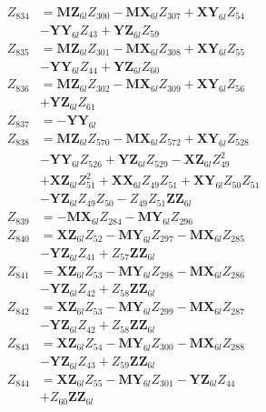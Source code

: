 \begin{multicols}{2}
\begin{align}
Z_{834} &= \mathbf{MZ}_{6l}Z_{300} - \mathbf{MX}_{6l}Z_{307} + \mathbf{XY}_{6l}Z_{54}  \nonumber \\
&- \mathbf{YY}_{6l}Z_{43} + \mathbf{YZ}_{6l}Z_{59} \nonumber \\
Z_{835} &= \mathbf{MZ}_{6l}Z_{301} - \mathbf{MX}_{6l}Z_{308} + \mathbf{XY}_{6l}Z_{55}  \nonumber \\
&- \mathbf{YY}_{6l}Z_{44} + \mathbf{YZ}_{6l}Z_{60} \nonumber \\
Z_{836} &= \mathbf{MZ}_{6l}Z_{302} - \mathbf{MX}_{6l}Z_{309} + \mathbf{XY}_{6l}Z_{56}  \nonumber \\
&+ \mathbf{YZ}_{6l}Z_{61} \nonumber \\
Z_{837} &= -\mathbf{YY}_{6l} \nonumber \\
Z_{838} &= \mathbf{MZ}_{6l}Z_{570} - \mathbf{MX}_{6l}Z_{572} + \mathbf{XY}_{6l}Z_{528}  \nonumber \\
&- \mathbf{YY}_{6l}Z_{526} + \mathbf{YZ}_{6l}Z_{529} - \mathbf{XZ}_{6l}Z_{49}^2  \nonumber \\
&+ \mathbf{XZ}_{6l}Z_{51}^2 + \mathbf{XX}_{6l}Z_{49}Z_{51} + \mathbf{XY}_{6l}Z_{50}Z_{51}  \nonumber \\
&- \mathbf{YZ}_{6l}Z_{49}Z_{50} - Z_{49}Z_{51}\mathbf{ZZ}_{6l} \nonumber \\
Z_{839} &= - \mathbf{MX}_{6l}Z_{284} - \mathbf{MY}_{6l}Z_{296} \nonumber \\
Z_{840} &= \mathbf{XZ}_{6l}Z_{52} - \mathbf{MY}_{6l}Z_{297} - \mathbf{MX}_{6l}Z_{285}  \nonumber \\
&- \mathbf{YZ}_{6l}Z_{41} + Z_{57}\mathbf{ZZ}_{6l} \nonumber \\
Z_{841} &= \mathbf{XZ}_{6l}Z_{53} - \mathbf{MY}_{6l}Z_{298} - \mathbf{MX}_{6l}Z_{286}  \nonumber \\
&- \mathbf{YZ}_{6l}Z_{42} + Z_{58}\mathbf{ZZ}_{6l} \nonumber \\
Z_{842} &= \mathbf{XZ}_{6l}Z_{53} - \mathbf{MY}_{6l}Z_{299} - \mathbf{MX}_{6l}Z_{287}  \nonumber \\
&- \mathbf{YZ}_{6l}Z_{42} + Z_{58}\mathbf{ZZ}_{6l} \nonumber \\
Z_{843} &= \mathbf{XZ}_{6l}Z_{54} - \mathbf{MY}_{6l}Z_{300} - \mathbf{MX}_{6l}Z_{288}  \nonumber \\
&- \mathbf{YZ}_{6l}Z_{43} + Z_{59}\mathbf{ZZ}_{6l} \nonumber \\
Z_{844} &= \mathbf{XZ}_{6l}Z_{55} - \mathbf{MY}_{6l}Z_{301} - \mathbf{YZ}_{6l}Z_{44}  \nonumber \\
&+ Z_{60}\mathbf{ZZ}_{6l} \nonumber \\

\end{align}
\end{multicols}
